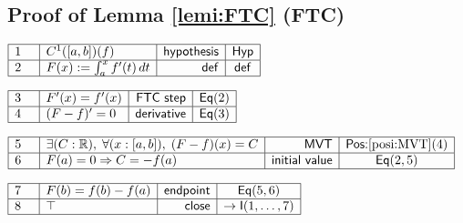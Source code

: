 \documentclass[11pt,reqno]{amsart}
\providecommand{\R}{\mathbb{R}}
\begin{document}
	\subsection*{Proof of Lemma \protect\ref{lemi:FTC} (\textsf{FTC})}
	\noindent$\begin{array}{|m{0.5cm}|l|r|c|}
	\hline
	1 & C^{1}([a,b])(f) & \mathsf{hypothesis} & \mathsf{Hyp} \\ \hline
	2 & F(x):=\int_{a}^{x}f^{\prime}(t)\,dt & \mathsf{def} & \mathsf{def} \\ \hline
	\end{array}$
	\par\nointerlineskip\noindent$\begin{array}{|m{0.5cm}|l|r|c|}
	\hline
	3 & F^{\prime}(x)=f^{\prime}(x) & \mathsf{FTC\ step} & \mathsf{Eq}(2) \\ \hline
	4 & (F-f)^{\prime}=0 & \mathsf{derivative} & \mathsf{Eq}(3) \\ \hline
	\end{array}$
	\par\nointerlineskip\noindent$\begin{array}{|m{0.5cm}|l|r|c|}
	\hline
	5 & \exists (C:\R),\;\forall (x:[a,b]),\;(F-f)(x)=C & \mathsf{MVT} & \textsf{Pos:}\ref{posi:MVT}(4) \\ \hline
	6 & F(a)=0\Rightarrow C=-f(a) & \mathsf{initial\ value} & \mathsf{Eq}(2,5) \\ \hline
	\end{array}$
	\par\nointerlineskip\noindent$\begin{array}{|m{0.5cm}|l|r|c|}
	\hline
	7 & F(b)=f(b)-f(a) & \mathsf{endpoint} & \mathsf{Eq}(5,6) \\ \hline
	8 & \top & \mathsf{close} & \to\mathsf{I}(1,\dots,7) \\ \hline
	\end{array}$
	\medskip
	
\end{document}
